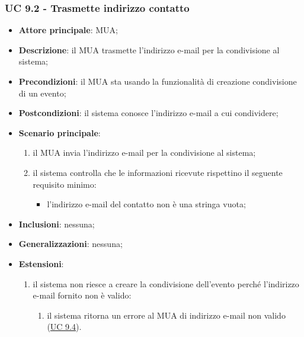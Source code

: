     \subsubsection{UC 9.2 - Trasmette indirizzo contatto} \label{sec:UC9.2}
    \begin{itemize}
        \item \textbf{Attore principale}: MUA;
        \item \textbf{Descrizione}: il MUA trasmette l'indirizzo e-mail per la condivisione al sistema;
        \item \textbf{Precondizioni}: il MUA sta usando la funzionalità di creazione condivisione di un evento;
        \item \textbf{Postcondizioni}: il sistema conosce l'indirizzo e-mail a cui condividere;
        \item \textbf{Scenario principale}:
            \begin{enumerate}
                \item il MUA invia l'indirizzo e-mail per la condivisione al sistema;
                \item il sistema controlla che le informazioni ricevute rispettino il seguente requisito minimo:
                    \begin{itemize}
                        \item l'indirizzo e-mail del contatto non è una stringa vuota;
                    \end{itemize}
            \end{enumerate}
        \item \textbf{Inclusioni}: nessuna;
        \item \textbf{Generalizzazioni}: nessuna;
        \item \textbf{Estensioni}:
            \begin{enumerate}[label=\alph*.]
                \item il sistema non riesce a creare la condivisione dell'evento perché l'indirizzo e-mail fornito non è valido:
                \begin{enumerate}[label=\arabic*.]
                    \item il sistema ritorna un errore al MUA di indirizzo e-mail non valido (\hyperref[sec:UC9.4]{UC 9.4}).
                \end{enumerate}
            \end{enumerate}
    \end{itemize}


